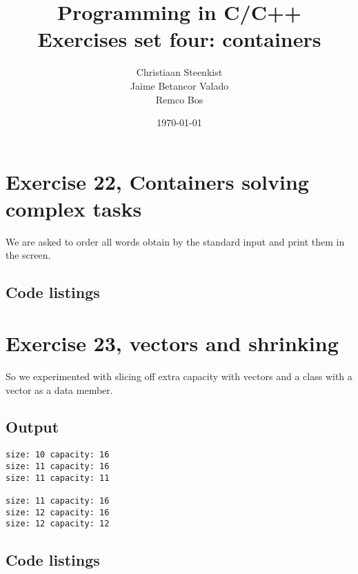 \documentclass[11pt]{article}
\begin{document}
\title{Programming in C/C++ \\
       Exercises set four: containers
}
\date{\today}
\author{Christiaan Steenkist \\
Jaime Betancor Valado \\
Remco Bos \\
}

\maketitle

\section*{Exercise 22, Containers solving complex tasks}
We are asked to order all words obtain by the standard input and print them in the screen.

\subsection*{Code listings}



\section*{Exercise 23, vectors and shrinking}
So we experimented with slicing off extra capacity with vectors and a class with a vector as a data member.

\subsection*{Output}
\begin{lstlisting}
size: 10 capacity: 16
size: 11 capacity: 16
size: 11 capacity: 11

size: 11 capacity: 16
size: 12 capacity: 16
size: 12 capacity: 12
\end{lstlisting}

\subsection*{Code listings}






\end{document}
